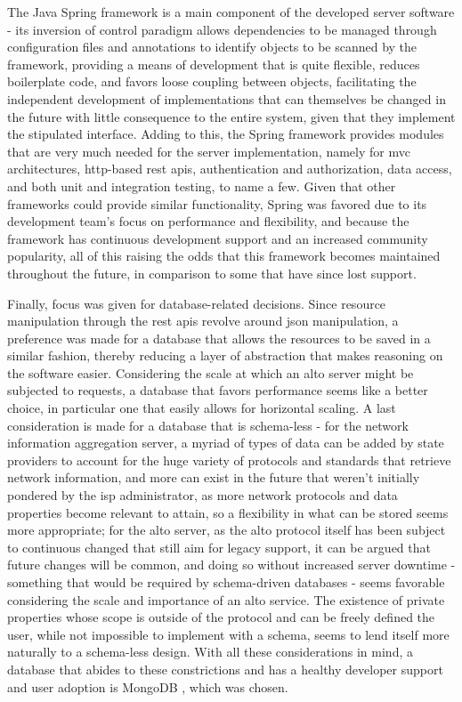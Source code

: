    The Java Spring framework \cite{java-spring} is a main component of the developed server software - its inversion of control paradigm allows dependencies to be managed through configuration files and annotations to identify objects to be scanned by the framework, providing a means of development that is quite flexible, reduces boilerplate code, and favors loose coupling between objects, facilitating the independent development of implementations that can themselves be changed in the future with little consequence to the entire system, given that they implement the stipulated interface.
    Adding to this, the Spring framework provides modules that are very much needed for the server implementation, namely for \gls{mvc} architectures, \gls{http}-based \gls{rest} \glspl{api}, authentication and authorization, data access, and both unit and integration testing, to name a few.
    Given that other frameworks could provide similar functionality, Spring was favored due to its development team's focus on performance and flexibility, and because the framework has continuous development support and an increased community popularity, all of this raising the odds that this framework becomes maintained throughout the future, in comparison to some that have since lost support.

    Finally, focus was given for database-related decisions.
    Since resource manipulation through the \gls{rest} \glspl{api} revolve around \gls{json} manipulation, a preference was made for a database that allows the resources to be saved in a similar fashion, thereby reducing a layer of abstraction that makes reasoning on the software easier.
    Considering the scale at which an \gls{alto} server might be subjected to requests, a database that favors performance seems like a better choice, in particular one that easily allows for horizontal scaling.
    A last consideration is made for a database that is schema-less - for the network information aggregation server, a myriad of types of data can be added by state providers to account for the huge variety of protocols and standards that retrieve network information, and more can exist in the future that weren't initially pondered by the \gls{isp} administrator, as more network protocols and data properties become relevant to attain, so a flexibility in what can be stored seems more appropriate; for the \gls{alto} server, as the \gls{alto} protocol itself has been subject to continuous changed that still aim for legacy support, it can be argued that future changes will be common, and doing so without increased server downtime - something that would be required by schema-driven databases - seems favorable considering the scale and importance of an \gls{alto} service.
    The existence of private properties whose scope is outside of the protocol and can be freely defined the user, while not impossible to implement with a schema, seems to lend itself more naturally to a schema-less design.
    With all these considerations in mind, a database that abides to these constrictions and has a healthy developer support and user adoption is MongoDB \cite{mongodb}, which was chosen.

